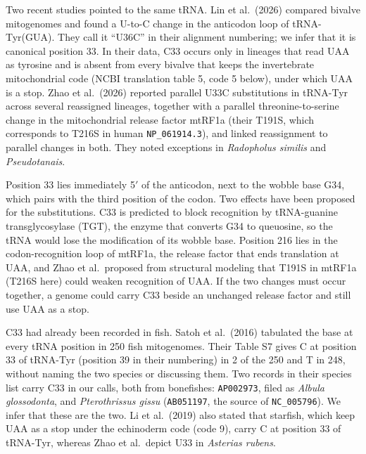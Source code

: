 \documentclass[11pt, a4paper]{article}
\begin{document}
Two recent studies pointed to the same tRNA. Lin et al.\ (2026) compared bivalve mitogenomes and found a U-to-C change in the anticodon loop of tRNA-Tyr(GUA). They call it ``U36C'' in their alignment numbering; we infer that it is canonical position 33. In their data, C33 occurs only in lineages that read UAA as tyrosine and is absent from every bivalve that keeps the invertebrate mitochondrial code (NCBI translation table 5, code 5 below), under which UAA is a stop. Zhao et al.\ (2026) reported parallel U33C substitutions in tRNA-Tyr across several reassigned lineages, together with a parallel threonine-to-serine change in the mitochondrial release factor mtRF1a (their T191S, which corresponds to T216S in human \texttt{NP\_061914.3}), and linked reassignment to parallel changes in both. They noted exceptions in \textit{Radopholus similis} and \textit{Pseudotanais}.

Position 33 lies immediately 5$'$ of the anticodon, next to the wobble base G34, which pairs with the third position of the codon. Two effects have been proposed for the substitutions. C33 is predicted to block recognition by tRNA-guanine transglycosylase (TGT), the enzyme that converts G34 to queuosine, so the tRNA would lose the modification of its wobble base. Position 216 lies in the codon-recognition loop of mtRF1a, the release factor that ends translation at UAA, and Zhao et al.\ proposed from structural modeling that T191S in mtRF1a (T216S here) could weaken recognition of UAA. If the two changes must occur together, a genome could carry C33 beside an unchanged release factor and still use UAA as a stop.

C33 had already been recorded in fish. Satoh et al.\ (2016) tabulated the base at every tRNA position in 250 fish mitogenomes. Their Table S7 gives C at position 33 of tRNA-Tyr (position 39 in their numbering) in 2 of the 250 and T in 248, without naming the two species or discussing them. Two records in their species list carry C33 in our calls, both from bonefishes: \texttt{AP002973}, filed as \textit{Albula glossodonta}, and \textit{Pterothrissus gissu} (\texttt{AB051197}, the source of \texttt{NC\_005796}). We infer that these are the two. Li et al.\ (2019) also stated that starfish, which keep UAA as a stop under the echinoderm code (code 9), carry C at position 33 of tRNA-Tyr, whereas Zhao et al.\ depict U33 in \textit{Asterias rubens}.
\end{document}

